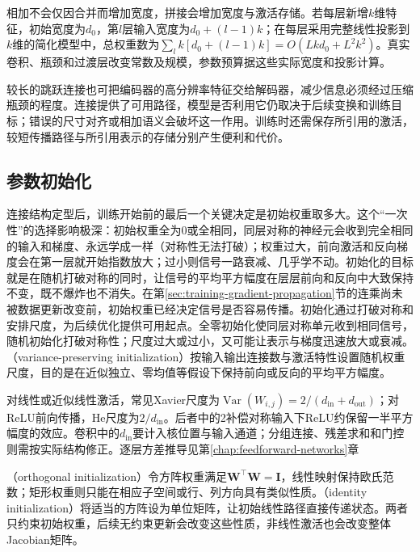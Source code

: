 相加不会仅因合并而增加宽度，拼接会增加宽度与激活存储。若每层新增$k$维特征，初始宽度为$d_0$，第$l$层输入宽度为$d_0+(l-1)k$；在每层采用完整线性投影到$k$维的简化模型中，总权重数为$\sum_l k[d_0+(l-1)k]=O(Lkd_0+L^2k^2)$。真实卷积、瓶颈和过渡层改变常数及规模，参数预算据这些实际宽度和投影计算。

较长的跳跃连接也可把编码器的高分辨率特征交给解码器，减少信息必须经过压缩瓶颈的程度。连接提供了可用路径，模型是否利用它仍取决于后续变换和训练目标；错误的尺寸对齐或相加语义会破坏这一作用。训练时还需保存所引用的激活，较短传播路径与所引用表示的存储分别产生便利和代价。

\subsection{参数初始化}
\label{sec:training-initialization-constraints}
\label{sec:training-initialization}

连接结构定型后，训练开始前的最后一个关键决定是初始权重取多大。这个“一次性”的选择影响极深：初始权重全为0或全相同，同层对称的神经元会收到完全相同的输入和梯度、永远学成一样（对称性无法打破）；权重过大，前向激活和反向梯度会在第一层就开始指数放大；过小则信号一路衰减、几乎学不动。初始化的目标就是在随机打破对称的同时，让信号的平均平方幅度在层层前向和反向中大致保持不变，既不爆炸也不消失。在第\ref{sec:training-gradient-propagation}节的连乘尚未被数据更新改变前，初始权重已经决定信号是否容易传播。初始化通过打破对称和安排尺度，为后续优化提供可用起点。全零初始化使同层对称单元收到相同信号，随机初始化打破对称性；尺度过大或过小，又可能让表示与梯度迅速放大或衰减。（variance-preserving initialization）按输入输出连接数与激活特性设置随机权重尺度，目的是在近似独立、零均值等假设下保持前向或反向的平均平方幅度。

对线性或近似线性激活，常见Xavier尺度为$\operatorname{Var}(W_{i,j})=2/(d_{\mathrm{in}}+d_{\mathrm{out}})$；对ReLU前向传播，He尺度为$2/d_{\mathrm{in}}$。后者中的2补偿对称输入下ReLU约保留一半平方幅度的效应。卷积中的$d_{\mathrm{in}}$要计入核位置与输入通道；分组连接、残差求和和门控则需按实际结构修正。逐层方差推导见第\ref{chap:feedforward-networks}章

（orthogonal initialization）令方阵权重满足$\bm W^{\top}\bm W=\bm I$，线性映射保持欧氏范数；矩形权重则只能在相应子空间或行、列方向具有类似性质。（identity initialization）将适当的方阵设为单位矩阵，让初始线性路径直接传递状态。两者只约束初始权重，后续无约束更新会改变这些性质，非线性激活也会改变整体Jacobian矩阵。


